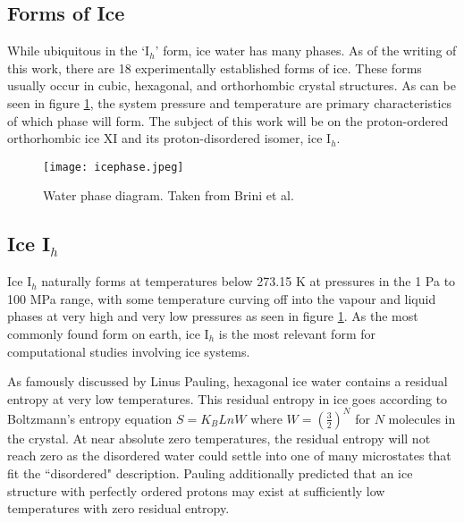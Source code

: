 \subsection{Forms of Ice}

While ubiquitous in the `I$_{h}$' form, ice water has many phases.
As of the writing of this work, there are 18 experimentally established forms of ice. 
These forms usually occur in cubic, hexagonal, and orthorhombic crystal structures.
As can be seen in figure \ref{fig:icePhases}, the system pressure and temperature are primary characteristics of which phase will form.
The subject of this work will be on the proton-ordered orthorhombic ice XI and its proton-disordered isomer, ice I$_{h}$.

\begin{figure}
	
	\centering
	
	\texttt{[image: icephase.jpeg]}
	
	\caption{Water phase diagram. Taken from Brini et al. \cite{BriniWaterProperties}}
	
	\label{fig:icePhases}
	
\end{figure}

\subsection{Ice I$_{h}$}

Ice I$_{h}$ naturally forms at temperatures below 273.15 K at pressures in the 1 Pa to 100 MPa range,\cite{IceTPLimits} with some temperature curving off into the vapour and liquid phases at very high and very low pressures as seen in figure \ref{fig:icePhases}.
As the most commonly found form on earth, ice I$_{h}$ is the most relevant form for computational studies involving ice systems.

As famously discussed by Linus Pauling, hexagonal ice water contains a residual entropy at very low temperatures.\cite{PaulingIce} 
This residual entropy in ice goes according to Boltzmann's entropy equation $S=K_{B}LnW$ where $W=(\frac{3}{2})^{N}$ for $N$ molecules in the crystal.
At near absolute zero temperatures, the residual entropy will not reach zero as the disordered water could settle into one of many microstates that fit the ``disordered" description.
Pauling additionally predicted that an ice structure with perfectly ordered protons may exist at sufficiently low temperatures with zero residual entropy.

